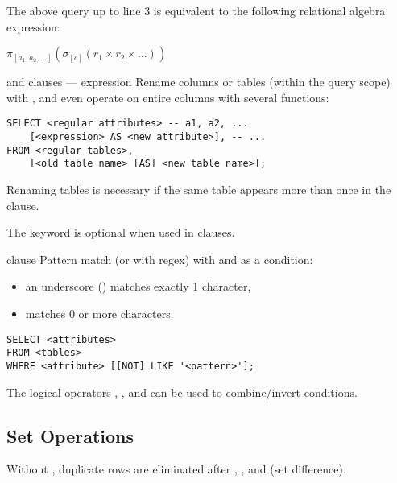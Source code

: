 The above query up to line 3 is equivalent to the following relational algebra expression:

$ \pi_{[a_1, a_2, \dots]} \left(\sigma_{[c]} (r_1 \times r_2 \times ...) \right) $

\begin{defn}{ and  clauses ---  expression}
    Rename columns or tables (within the query scope) with , and even operate on entire columns with several functions:
    \begin{itemize}
    \end{itemize}

    \begin{lstlisting}
SELECT <regular attributes> -- a1, a2, ...
    [<expression> AS <new attribute>], -- ...
FROM <regular tables>,
    [<old table name> [AS] <new table name>];
    \end{lstlisting}

    Renaming tables is necessary if the same table appears more than once in the  clause.
    
    The  keyword is optional when used in  clauses.
\end{defn}

\begin{defn}{ clause}
    Pattern match (or with regex) with  and  as a condition:
    \begin{itemize}
        \item an underscore (\code{\_}) matches exactly 1 character,
        \item \code{\%} matches 0 or more characters.
    \end{itemize}

    \begin{lstlisting}
SELECT <attributes>
FROM <tables>
WHERE <attribute> [[NOT] LIKE '<pattern>'];
    \end{lstlisting}

    The logical operators , , and  can be used to combine/invert conditions.
\end{defn}

\subsection{Set Operations}
Without , duplicate rows are eliminated after , ,
and  (set difference).

